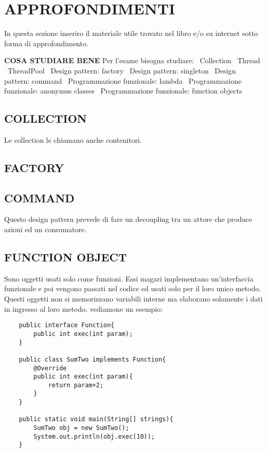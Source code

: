 

\newpage
\section{APPROFONDIMENTI}
In questa sezione inseriro il materiale utile trovato nel libro e/o su internet sotto forma di approfondimento. 


\noindent \textbf{COSA STUDIARE BENE} \newline
Per l'esame bisogna studiare: \newline
\textbullet\ Collection \newline
\textbullet\ Thread \newline
\textbullet\ ThreadPool \newline
\textbullet\ Design pattern: factory \newline
\textbullet\ Design pattern: singleton \newline
\textbullet\ Design pattern: command \newline
\textbullet\ Programmazione funzionale: lambda \newline
\textbullet\ Programmazione funzionale: anonymus classes \newline
\textbullet\ Programmazione funzionale: function objects \newline


\subsection{COLLECTION}
\noindent Le collection le chiamano anche contenitori.


\subsection{FACTORY}


\subsection{COMMAND}
Questo design pattern prevede di fare un decoupling tra un attore che produce azioni ed un consumatore.



\subsection{FUNCTION OBJECT}
\noindent Sono oggetti usati solo come funzioni. Essi magari implementano un'interfaccia funzionale e poi vengono passati nel codice ed usati solo per il loro unico metodo. Questi oggetti non si memorizzano variabili interne ma elaborano solamente i dati in ingresso al loro metodo. vediamone un esempio:
\begin{lstlisting}
	public interface Function{
		public int exec(int param);
	}
	
	public class SumTwo implements Function{
		@Override
		public int exec(int param){
			return param+2;
		}
	}
	
	public static void main(String[] strings){
		SumTwo obj = new SumTwo();
		System.out.println(obj.exec(10));
	}
\end{lstlisting}


